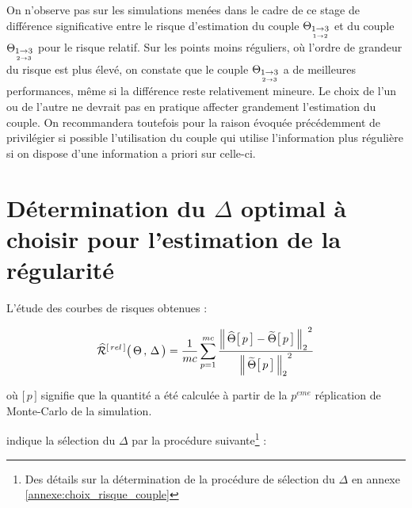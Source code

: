 
On n'observe pas sur les simulations menées dans le cadre de ce stage de différence significative entre le risque d'estimation du couple $\thetaA$ et du couple $\thetaB$ pour le risque relatif. Sur les points moins réguliers, où l'ordre de grandeur du risque est plus élevé, on constate que le couple $\thetaB$ a de meilleures performances, même si la différence reste relativement mineure. Le choix de l'un ou de l'autre ne devrait pas en pratique affecter grandement l'estimation du couple. On recommandera toutefois pour la raison évoquée précédemment de privilégier si possible l'utilisation du couple qui utilise l'information plus régulière si on dispose d'une information a priori sur celle-ci.

\section{Détermination du $\Delta$ optimal à choisir pour l'estimation de la régularité}
\label{sec:determination-delta}

\noindent L'étude des courbes de risques obtenues :

\begin{equation}
	\widehat{\mathcal R}^{[\,rel\,]} \bigl( \, \Theta \, , \, \Delta \, \bigr)
	= 
	\frac 1 {mc} \sum\limits_{p=1}^{mc} \frac{{\distnorme 2 {\widehat \Theta\bigl[\, p \,\bigr]} {\widetilde \Theta \bigl[ \,p \,\bigr]}}^2}{{\norme 2 {\widetilde \Theta \bigl[ \,p \,\bigr]}}^2}
\end{equation}

\smallskip
\noindent où $\bigl[\, p \,\bigr]$ signifie que la quantité a été calculée à partir de la $p^{eme}$ réplication de Monte-Carlo de la simulation.

\bigskip

\noindent indique la sélection du $\Delta$ par la procédure suivante\footnote{Des détails sur la détermination de la procédure de sélection du $\Delta$ en annexe \ref{annexe:choix_risque_couple}} :

